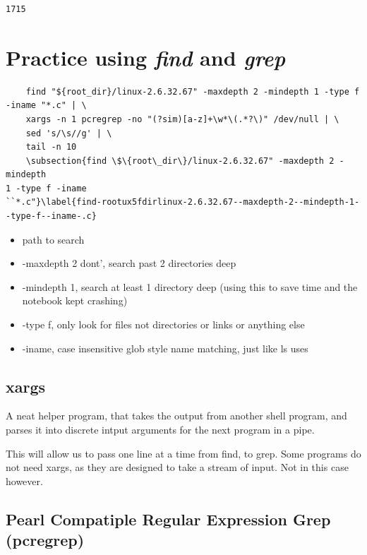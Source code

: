 \documentclass{article}
\begin{document}
    \begin{Verbatim}[commandchars=\\\{\}]
1715
    \end{Verbatim}

    \section{Practice using \emph{find} and
\emph{grep}}\label{practice-using-find-and-grep}
\begin{Verbatim}
    find "${root_dir}/linux-2.6.32.67" -maxdepth 2 -mindepth 1 -type f -iname "*.c" | \
    xargs -n 1 pcregrep -no "(?sim)[a-z]+\w*\(.*?\)" /dev/null | \
    sed 's/\s//g' | \
    tail -n 10
    \subsection{find \$\{root\_dir\}/linux-2.6.32.67" -maxdepth 2 -mindepth
1 -type f -iname
``*.c"}\label{find-rootux5fdirlinux-2.6.32.67--maxdepth-2--mindepth-1--type-f--iname-.c}
\end{Verbatim}

\begin{itemize}
\itemsep1pt\parskip0pt
\item
  path to search
\item
  -maxdepth 2 dont', search past 2 directories deep
\item
  -mindepth 1, search at least 1 directory deep (using this to save time
  and the notebook kept crashing)
\item
  -type f, only look for files not directories or links or anything else
\item
  -iname, case insensitive glob style name matching, just like ls uses
\end{itemize}

\subsection{xargs}\label{xargs}

A neat helper program, that takes the output from another shell program,
and parses it into discrete intput arguments for the next program in a
pipe.

This will allow us to pass one line at a time from find, to grep. Some
programs do not need xargs, as they are designed to take a stream of
input. Not in this case however.

\subsection{Pearl Compatiple Regular Expression Grep (pcregrep)}
\end{document}

